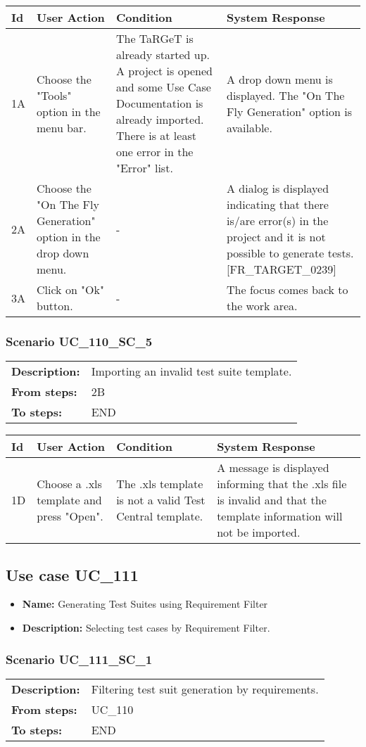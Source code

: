 \documentclass[a4paper,11pt]{article}
\newcommand{\bl}{\\ \hline}
\begin{document}
\begin{tabular}{|p{0.8in}|p{1.6in}|p{1.6in}|p{1.6in}|}
\hline
Id & User Action & Condition & System Response  \bl 
1A & Choose the "Tools" option in the menu bar. & The TaRGeT is already started up. A project is opened and some Use Case Documentation is already imported. There is at least one error in the "Error" list. & A drop down menu is displayed. The "On The Fly Generation" option is available. \bl 
2A & Choose the "On The Fly Generation" option in the drop down menu. & - & A dialog is displayed indicating that there is/are error(s) in the project and it is not possible to generate tests. [FR_TARGET_0239] \bl 
3A & Click on "Ok" button. & - & The focus comes back to the work area. \bl 
\end{tabular}
\subsubsection*{Scenario UC_110_SC_5}
\begin{tabular}{p{1in}p{4in}}
{\bf Description:} & Importing an invalid test suite template. \\
{\bf From steps:} & 2B \\
{\bf To steps:} & END \\
\end{tabular}
 
\begin{tabular}{|p{0.8in}|p{1.6in}|p{1.6in}|p{1.6in}|}
\hline
Id & User Action & Condition & System Response  \bl 
1D & Choose a .xls template and press "Open". & The .xls template is not a valid Test Central template. & A message is displayed informing that the .xls file is invalid and that the template information will not be imported. \bl 
\end{tabular}
\subsection*{Use case UC_111}
\begin{itemize}
\item {\bf Name: }Generating Test Suites using Requirement Filter
\item {\bf Description: }Selecting test cases by Requirement Filter.
\end{itemize}
\subsubsection*{Scenario UC_111_SC_1}
\begin{tabular}{p{1in}p{4in}}
{\bf Description:} & Filtering test suit generation by requirements. \\
{\bf From steps:} & UC_110#2M \\
{\bf To steps:} & END \\
\end{tabular}
 
\end{document}

